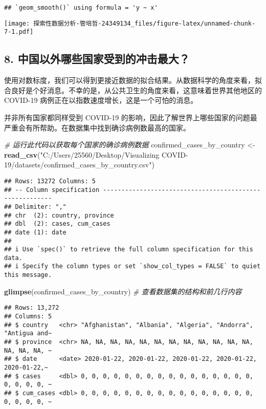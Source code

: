 \documentclass[
]{article}
\newenvironment{Shaded}{\begin{snugshade}}{\end{snugshade}}
\newcommand{\CommentTok}[1]{\textcolor[rgb]{0.56,0.35,0.01}{\textit{#1}}}
\newcommand{\FunctionTok}[1]{\textcolor[rgb]{0.13,0.29,0.53}{\textbf{#1}}}
\newcommand{\NormalTok}[1]{#1}
\newcommand{\OtherTok}[1]{\textcolor[rgb]{0.56,0.35,0.01}{#1}}
\newcommand{\StringTok}[1]{\textcolor[rgb]{0.31,0.60,0.02}{#1}}
\begin{document}
\begin{verbatim}
## `geom_smooth()` using formula = 'y ~ x'
\end{verbatim}

\texttt{[image: 探索性数据分析-管培哲-24349134\_files/figure-latex/unnamed-chunk-7-1.pdf]}

\subsection{8.
中国以外哪些国家受到的冲击最大？}\label{ux4e2dux56fdux4ee5ux5916ux54eaux4e9bux56fdux5bb6ux53d7ux5230ux7684ux51b2ux51fbux6700ux5927}

使用对数标度，我们可以得到更接近数据的拟合结果。从数据科学的角度来看，拟合良好是个好消息。不幸的是，从公共卫生的角度来看，这意味着世界其他地区的
COVID-19 病例正在以指数速度增长，这是一个可怕的消息。

并非所有国家都同样受到 COVID-19
的影响，因此了解世界上哪些国家的问题最严重会有所帮助。在数据集中找到确诊病例数最高的国家。

\begin{Shaded}
\begin{Highlighting}[]
\CommentTok{\# 运行此代码以获取每个国家的确诊病例数据}
\NormalTok{confirmed\_cases\_by\_country }\OtherTok{\textless{}{-}} \FunctionTok{read\_csv}\NormalTok{(}\StringTok{"C:/Users/25560/Desktop/Visualizing COVID{-}19/datasets/confirmed\_cases\_by\_country.csv"}\NormalTok{)}
\end{Highlighting}
\end{Shaded}

\begin{verbatim}
## Rows: 13272 Columns: 5
## -- Column specification --------------------------------------------------------
## Delimiter: ","
## chr  (2): country, province
## dbl  (2): cases, cum_cases
## date (1): date
## 
## i Use `spec()` to retrieve the full column specification for this data.
## i Specify the column types or set `show_col_types = FALSE` to quiet this message.
\end{verbatim}

\begin{Shaded}
\begin{Highlighting}[]
\FunctionTok{glimpse}\NormalTok{(confirmed\_cases\_by\_country)  }\CommentTok{\# 查看数据集的结构和前几行内容}
\end{Highlighting}
\end{Shaded}

\begin{verbatim}
## Rows: 13,272
## Columns: 5
## $ country   <chr> "Afghanistan", "Albania", "Algeria", "Andorra", "Antigua and~
## $ province  <chr> NA, NA, NA, NA, NA, NA, NA, NA, NA, NA, NA, NA, NA, NA, NA, ~
## $ date      <date> 2020-01-22, 2020-01-22, 2020-01-22, 2020-01-22, 2020-01-22,~
## $ cases     <dbl> 0, 0, 0, 0, 0, 0, 0, 0, 0, 0, 0, 0, 0, 0, 0, 0, 0, 0, 0, 0, ~
## $ cum_cases <dbl> 0, 0, 0, 0, 0, 0, 0, 0, 0, 0, 0, 0, 0, 0, 0, 0, 0, 0, 0, 0, ~
\end{verbatim}
\end{document}
